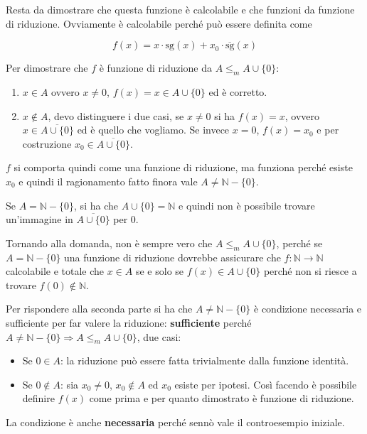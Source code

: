 Resta da dimostrare che questa funzione è calcolabile e che funzioni da funzione di riduzione.
Ovviamente è calcolabile perché può essere definita come

$$
f(x) = x \cdot \text{sg}(x) + x_0 \cdot  \overline{\text{sg}}(x)
$$

Per dimostrare che $f$ è funzione di riduzione da $A \leq_m A \cup \{0\}$:

\begin{enumerate}
	\item $x \in A$ ovvero $x \neq 0$, $f(x) = x \in A\cup\{0\}$ ed è corretto.
	\item $x \notin A$, devo distinguere i due casi, se $x \neq 0$ si ha $f(x) = x$, ovvero $x \in \overline{A \cup \{0\}} $ ed è quello che vogliamo. Se invece $x = 0$, $f(x) = x_0$ e per costruzione $x_0 \in \overline{A \cup \{0\}}$.
\end{enumerate}

$f$ si comporta quindi come una funzione di riduzione, ma funziona perché esiste $x_0$ e quindi il ragionamento fatto finora vale $A \neq \mathbb{N}  - \{0\}$.

Se $A = \mathbb{N}  - \{0\}$, si ha che $A \cup \{0\} = \mathbb{N}$ e quindi non è possibile trovare un'immagine in $\overline{A \cup \{0\}}$ per $0$.

Tornando alla domanda, non è sempre vero che $A \leq_m A \cup \{0\}$, perché se $A = \mathbb{N}-\{0\}$ una funzione di riduzione dovrebbe assicurare che $f : \mathbb{N} \rightarrow \mathbb{N}$ calcolabile e totale che $x \in A$ se e solo se $f(x) \in A \cup \{0\}$ perché non si riesce a trovare $f(0) \notin \mathbb{N}$.

Per rispondere alla seconda parte si ha che $A \neq \mathbb{N} - \{0\}$ è condizione necessaria e sufficiente per far valere la riduzione: \textbf{sufficiente} perché $A \neq \mathbb{N} - \{0\} \Rightarrow A \leq_m A \cup \{0\}$, due casi:

\begin{itemize}
	\item Se $0 \in A$: la riduzione può essere fatta trivialmente dalla funzione identità.
	\item Se $0 \notin A $: sia $x_0 \neq 0$, $x_0 \notin A$ ed $x_0$ esiste per ipotesi. Così facendo è possibile definire $f(x)$ come prima e per quanto dimostrato è funzione di riduzione. 
\end{itemize}

La condizione è anche \textbf{necessaria} perché sennò vale il controesempio iniziale.

